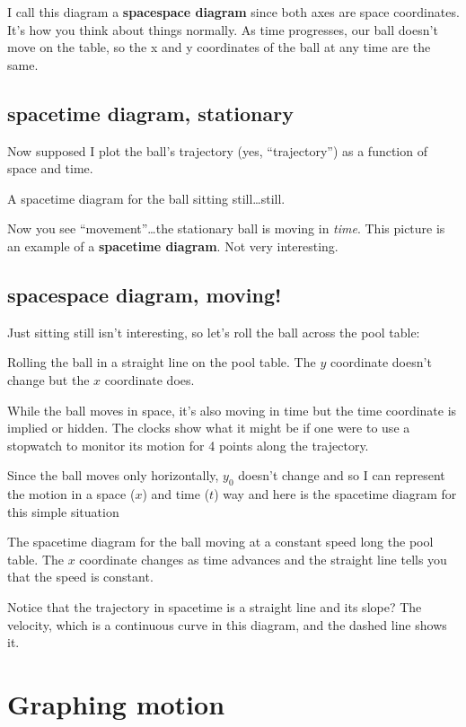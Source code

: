 \documentclass[
  letterpaper,
  DIV=11,
  numbers=noendperiod,
  oneside]{scrreprt}
\begin{document}
I call this diagram a \textbf{spacespace diagram} since both axes are
space coordinates. It's how you think about things normally. As time
progresses, our ball doesn't move on the table, so the x and y
coordinates of the ball at any time are the same.

\subsection{spacetime diagram,
stationary}\label{spacetime-diagram-stationary}

Now supposed I plot the ball's trajectory (yes, ``trajectory'') as a
function of space and time.

A spacetime diagram for the ball sitting still\ldots still.

Now you see ``movement''\ldots the stationary ball is moving in
\emph{time}. This picture is an example of a \textbf{spacetime diagram}.
Not very interesting.

\subsection{spacespace diagram,
moving!}\label{spacespace-diagram-moving}

Just sitting still isn't interesting, so let's roll the ball across the
pool table:

Rolling the ball in a straight line on the pool table. The \(y\)
coordinate doesn't change but the \(x\) coordinate does.

While the ball moves in space, it's also moving in time but the time
coordinate is implied or hidden. The clocks show what it might be if one
were to use a stopwatch to monitor its motion for 4 points along the
trajectory.

Since the ball moves only horizontally, \(y_0\) doesn't change and so I
can represent the motion in a space (\(x\)) and time (\(t\)) way and
here is the spacetime diagram for this simple situation

The spacetime diagram for the ball moving at a constant speed long the
pool table. The \(x\) coordinate changes as time advances and the
straight line tells you that the speed is constant.

Notice that the trajectory in spacetime is a straight line and its
slope? The velocity, which is a continuous curve in this diagram, and
the dashed line shows it.

\section{Graphing motion}\label{graphing-motion}
\end{document}
